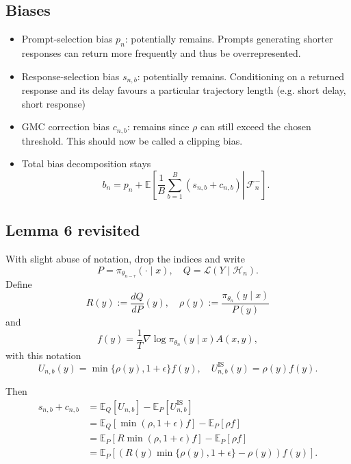 \subsection*{Biases}
\begin{itemize}
    \item Prompt-selection bias $p_n$: potentially remains. Prompts generating shorter responses can return more frequently and thus be overrepresented.
    \item Response-selection bias $s_{n,b}$: potentially remains. Conditioning on a returned response and its delay favours a particular trajectory length (e.g. short delay, short response)
    \item GMC correction bias $c_{n,b}$: remains since $\rho$ can still exceed the chosen threshold. This should now be called a clipping bias.
    \item Total bias decomposition stays 
    \begin{equation*}
       b_n=p_n+\mathbb{E}\left[\left.\frac{1}{B} \sum_{b=1}^B\left(s_{n, b}+c_{n, b}\right) \right\rvert\, \mathcal{F}_n^{-}\right] .
    \end{equation*}


\end{itemize}

\subsection*{Lemma 6 revisited}
With slight abuse of notation, drop the indices and write $$P=\pi_{\theta_{n-\tau}}(\cdot \mid x), \quad Q=\mathcal{L}\left(Y \mid \mathcal{H}_n\right).$$ Define $$R(y):=\frac{d Q}{d P}(y), \quad \rho(y):=\frac{\pi_{\theta_n}(y \mid x)}{P(y)}$$ and $$f(y)=\frac{1}{T} \nabla \log \pi_{\theta_n}(y \mid x) A(x, y),$$
with this notation
$$U_{n, b}(y)=\min \{\rho(y), 1+\epsilon\} f(y), \quad U_{n, b}^{\mathrm{IS}}(y)=\rho(y) f(y) .$$

Then 
\begin{align} \label{lemma6revisit}
s_{n, b}+c_{n, b} &= \mathbb{E}_Q\left[U_{n, b}\right]-\mathbb{E}_P\left[U_{n, b}^{\mathrm{IS}}\right] \nonumber \\
&=\mathbb{E}_Q[\min (\rho, 1+\epsilon) f]-\mathbb{E}_P[\rho f] \nonumber \\
& =\mathbb{E}_P[R \min (\rho, 1+\epsilon) f]-\mathbb{E}_P[\rho f] \nonumber \\
&=\mathbb{E}_P[(R(y) \min \{\rho(y), 1+\epsilon\}-\rho(y)) f(y)].
\end{align}

